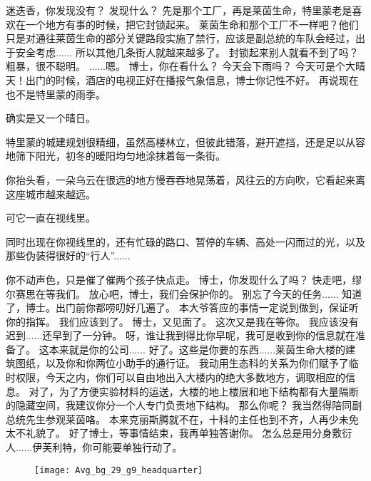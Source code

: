 \documentclass[openany]{book}
\begin{document}
\begin{dialogue}
     迷迭香，你发现没有？
     发现什么？
     先是那个工厂，再是莱茵生命，特里蒙老是喜欢在一个地方有事的时候，把它封锁起来。
     莱茵生命和那个工厂不一样吧？他们只是对通往莱茵生命的部分关键路段实施了禁行，应该是副总统的车队会经过，出于安全考虑......
     所以其他几条街人就越来越多了。
     封锁起来别人就看不到了吗？粗暴，很不聪明。
     ......嗯。
     博士，你在看什么？
     今天会下雨吗？
     今天可是个大晴天！出门的时候，酒店的电视正好在播报气象信息，博士你记性不好。
     再说现在也不是特里蒙的雨季。\par
    确实是又一个晴日。\par
    特里蒙的城建规划很精细，虽然高楼林立，但彼此错落，避开遮挡，还是足以从容地筛下阳光，初冬的暖阳均匀地涂抹着每一条街。\par
    你抬头看，一朵乌云在很远的地方慢吞吞地晃荡着，风往云的方向吹，它看起来离这座城市越来越远。\par
    可它一直在视线里。\par
    同时出现在你视线里的，还有忙碌的路口、暂停的车辆、高处一闪而过的光，以及那些伪装得很好的“行人”......\par
    你不动声色，只是催了催两个孩子快点走。
     博士，你发现什么了吗？
     快走吧，缪尔赛思在等我们。
     放心吧，博士，我们会保护你的。
     别忘了今天的任务......
     知道了，博士。出门前你都唠叨好几遍了。
     本大爷答应的事情一定说到做到，保证听你的指挥。
     我们应该到了。
     博士，又见面了。
     这次又是我在等你。
     我应该没有迟到......还早到了一分钟。
     呀，谁让我到得比你早呢，我可是收到你的信息就在准备了。
     这本来就是你的公司......
     好了。这些是你要的东西......莱茵生命大楼的建筑图纸，以及你和你两位小助手的通行证。
     我动用生态科的关系为你们赋予了临时权限，今天之内，你们可以自由地出入大楼内的绝大多数地方，调取相应的信息。
     对了，为了方便实验材料的运送，大楼的地上楼层和地下结构都有大量隔断的隐藏空间，我建议你分一个人专门负责地下结构。
     那么你呢？
     我当然得陪同副总统先生参观莱茵咯。
     本来克丽斯腾就不在，十科的主任也到不齐，人再少未免太不礼貌了。
     好了博士，等事情结束，我再单独答谢你。
     怎么总是用分身敷衍人......伊芙利特，你可能要单独行动了。
\end{dialogue}
\begin{figure}[h]
    \centering
    \texttt{[image: Avg\_bg\_29\_g9\_headquarter]}
\end{figure}
\end{document}
